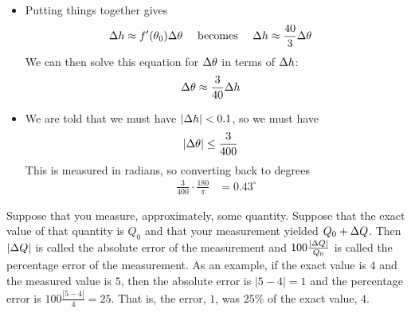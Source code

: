 \begin{eg}
\begin{itemize}
\item Putting things together gives
\begin{align*}
  \Delta h &\approx f'(\theta_0) \Delta \theta & \text{ becomes }&&
  \Delta h & \approx \frac{40}{3} \Delta \theta
\end{align*}
We can then solve this equation for $\Delta\theta$ in terms of $\Delta h$:
\begin{align*}
  \Delta \theta & \approx \frac{3}{40} \Delta h
\end{align*}

\item We are told that we must have $|\Delta h| < 0.1$, so we must have
\begin{align*}
  |\Delta \theta| &\leq \frac{3}{400}
\end{align*}
This is measured in radians, so converting back to degrees
\begin{align*}
  \frac{3}{400} \cdot \frac{180}{\pi} &= 0.43^\circ
\end{align*}

\end{itemize}

\end{eg}
\goodbreak

\begin{defn}\label{def:APPrelError} %
    Suppose that you measure, approximately, some quantity.
    Suppose that the exact value of that quantity is $Q_0$
    and that your measurement yielded $Q_0+\Delta Q$. Then
    $|\Delta Q|$ is called the absolute error of the measurement
    and $100\frac{|\Delta Q|}{Q_0}$ is called the percentage error
    of the measurement. As an example, if the exact
    value is $4$ and the measured value is $5$, then the absolute
    error is $|5-4|=1$ and the percentage error is
    $100\frac{|5-4|}{4}=25$. That is, the error, $1$, was $25\%$
    of the exact value, $4$.
\end{defn}


